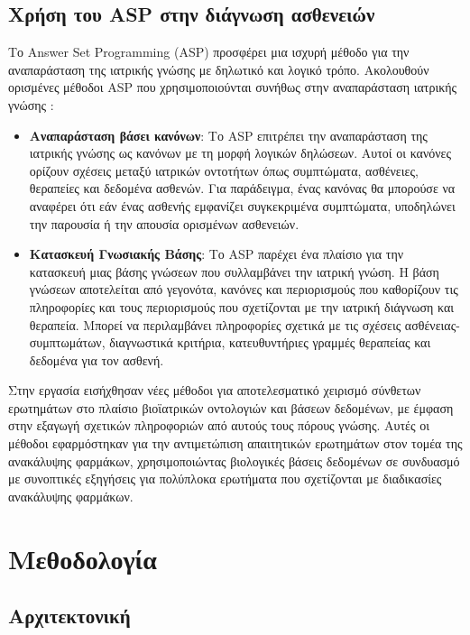 \documentclass[12pt]{extarticle}
\begin{document}
\subsection{Χρήση του ASP στην διάγνωση ασθενειών}
Το Answer Set Programming (ASP) προσφέρει μια ισχυρή μέθοδο για την αναπαράσταση της ιατρικής γνώσης με δηλωτικό και λογικό τρόπο. Ακολουθούν ορισμένες μέθοδοι ASP που χρησιμοποιούνται συνήθως στην αναπαράσταση ιατρικής γνώσης \cite{Vinarti2019}:

\begin{itemize}
    \item \textbf{Αναπαράσταση βάσει κανόνων}: Το ASP επιτρέπει την αναπαράσταση της ιατρικής γνώσης ως κανόνων με τη μορφή λογικών δηλώσεων. Αυτοί οι κανόνες ορίζουν σχέσεις μεταξύ ιατρικών οντοτήτων όπως συμπτώματα, ασθένειες, θεραπείες και δεδομένα ασθενών. Για παράδειγμα, ένας κανόνας θα μπορούσε να αναφέρει ότι εάν ένας ασθενής εμφανίζει συγκεκριμένα συμπτώματα, υποδηλώνει την παρουσία ή την απουσία ορισμένων ασθενειών. 

    \item \textbf{Κατασκευή Γνωσιακής Βάσης}: Το ASP παρέχει ένα πλαίσιο για την κατασκευή μιας βάσης γνώσεων που συλλαμβάνει την ιατρική γνώση. Η βάση γνώσεων αποτελείται από γεγονότα, κανόνες και περιορισμούς που καθορίζουν τις πληροφορίες και τους περιορισμούς που σχετίζονται με την ιατρική διάγνωση και θεραπεία. Μπορεί να περιλαμβάνει πληροφορίες σχετικά με τις σχέσεις ασθένειας-συμπτωμάτων, διαγνωστικά κριτήρια, κατευθυντήριες γραμμές θεραπείας και δεδομένα για τον ασθενή.

    
\end{itemize}

Στην εργασία \cite{Erdem2011} εισήχθησαν νέες μέθοδοι για αποτελεσματικό χειρισμό σύνθετων ερωτημάτων στο πλαίσιο βιοϊατρικών οντολογιών και βάσεων δεδομένων, με έμφαση στην εξαγωγή σχετικών πληροφοριών από αυτούς τους πόρους γνώσης. Aυτές οι μέθοδοι εφαρμόστηκαν για την αντιμετώπιση απαιτητικών ερωτημάτων στον τομέα της ανακάλυψης φαρμάκων, χρησιμοποιώντας βιολογικές βάσεις δεδομένων σε συνδυασμό με συνοπτικές εξηγήσεις για πολύπλοκα ερωτήματα που σχετίζονται με διαδικασίες ανακάλυψης φαρμάκων.


\section{Μεθοδολογία}

\subsection{Αρχιτεκτονική}
\end{document}
